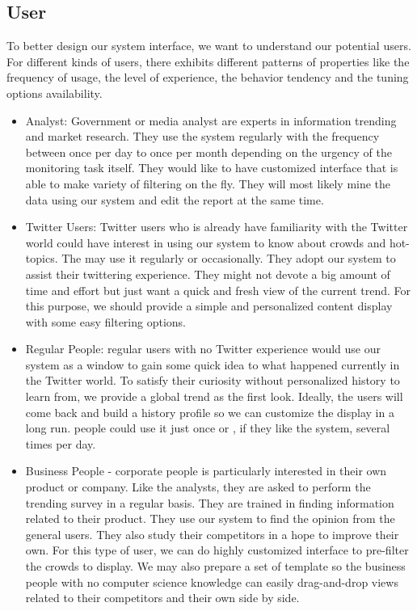 \documentclass{sig-alternate}
\begin{document}
\subsection{User}
To better design our system interface, we want to understand our potential users. For different kinds of users, there exhibits different patterns of properties like the frequency of usage, the level of experience, the behavior tendency and the tuning options availability.
\begin{itemize}
	\item Analyst: Government or media analyst are experts in information trending and market research. They use the system regularly with the frequency between once per day to once per month depending on the urgency of the monitoring task itself. They would like to have customized interface that is able to make variety of filtering on the fly. They will most likely mine the data using our system and edit the report at the same time.
	
	\item Twitter Users: Twitter users who is already have familiarity with the Twitter world could have interest in using our system to know about crowds and hot-topics. The may use it regularly or occasionally. They adopt our system to assist their twittering experience. They might not devote a big amount of time and effort but just want a quick and fresh view of the current trend. For this purpose, we should provide a simple and personalized content display with some easy filtering options.
	
	\item Regular People: regular users with no Twitter experience would use our system as a window to gain some quick idea to what happened currently in the Twitter world. To satisfy their curiosity without personalized history to learn from, we provide a global trend as the first look. Ideally, the users will come back and build a history profile so we can customize the display in a long run. people could use it just once or , if they like the system, several times per day.
	
	\item Business People - corporate people is particularly interested in their own product or company. Like the analysts, they are asked to perform the trending survey in a regular basis. They are trained in finding information related to their product. They use our system to find the opinion from the general users. They also study their competitors in a hope to improve their own. For this type of user, we can do highly customized interface to pre-filter the crowds to display. We may also prepare a set of template so the business people with no computer science knowledge can easily drag-and-drop views related to their competitors and their own side by side.
	
\end{itemize}
\end{document}
